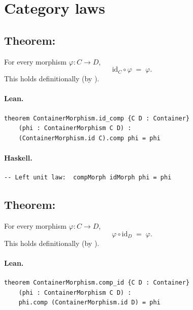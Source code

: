 \documentclass[11pt,a4paper]{article}
\begin{document}
\section{Category laws}

\subsection{Theorem: }

\begin{thm}
For every morphism $\varphi : C \to D$,
\[
  \mathrm{id}_C \circ \varphi \;=\; \varphi.
\]
This holds definitionally (by ).
\end{thm}

\paragraph{Lean.}
\begin{lstlisting}[style=lean]
theorem ContainerMorphism.id_comp {C D : Container}
    (phi : ContainerMorphism C D) :
    (ContainerMorphism.id C).comp phi = phi
\end{lstlisting}

\paragraph{Haskell.}
\begin{lstlisting}[style=haskell]
-- Left unit law:  compMorph idMorph phi = phi
\end{lstlisting}


\subsection{Theorem: }

\begin{thm}
For every morphism $\varphi : C \to D$,
\[
  \varphi \circ \mathrm{id}_D \;=\; \varphi.
\]
This holds definitionally (by ).
\end{thm}

\paragraph{Lean.}
\begin{lstlisting}[style=lean]
theorem ContainerMorphism.comp_id {C D : Container}
    (phi : ContainerMorphism C D) :
    phi.comp (ContainerMorphism.id D) = phi
\end{lstlisting}
\end{document}
